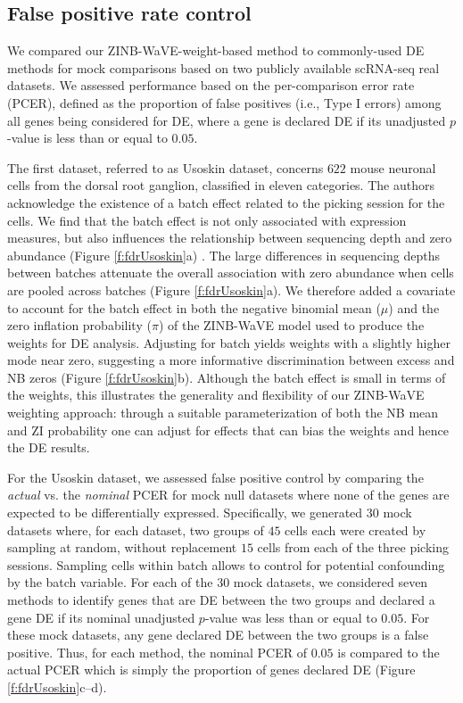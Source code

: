 \documentclass{bmcart}
\newcommand{\lc}[1]{\textcolor{ao}{*** LC: #1}}
\begin{document}
\subsection*{False positive rate control}

We compared our ZINB-WaVE-weight-based method to commonly-used DE methods for mock comparisons based on two publicly available scRNA-seq real datasets. We assessed performance based on the per-comparison error rate (PCER), defined as the proportion of false positives (i.e., Type I errors) among all genes being considered for DE, where a gene is declared DE if its unadjusted $p$-value is less than or equal to $0.05$. 

The first dataset, referred to as Usoskin \citep{Usoskin2014} dataset, concerns $622$ mouse neuronal cells from the dorsal root ganglion, classified in eleven categories. The authors acknowledge the existence of a batch effect related to the picking session for the cells. We find that the batch effect is not only associated with expression measures, but also influences the relationship between sequencing depth and zero abundance (Figure \ref{f:fdrUsoskin}a) \citep{Hicks2015}. The large differences in sequencing depths between batches attenuate the overall association with zero abundance when cells are pooled across batches (Figure \ref{f:fdrUsoskin}a). We therefore added a covariate to account for the batch effect in both the negative binomial mean ($\mu$) and the zero inflation probability ($\pi$) of the ZINB-WaVE model used to produce the weights for DE analysis. Adjusting for batch yields weights with a slightly higher mode near zero, suggesting a more informative discrimination between excess and NB zeros (Figure \ref{f:fdrUsoskin}b). %
Although the batch effect is small in terms of the weights, this illustrates the generality and flexibility of our ZINB-WaVE weighting approach: through a suitable parameterization of both the NB mean and ZI probability one can adjust for effects that can bias the weights and hence the DE results. 

For the Usoskin dataset, we assessed false positive control by comparing the \textit{actual} vs. the \textit{nominal} PCER for mock null datasets where none of the genes are expected to be differentially expressed. Specifically, we generated $30$ mock datasets where, for each dataset, two groups of $45$ cells each were created by sampling at random, without replacement $15$ cells from each of the three picking sessions. Sampling cells within batch allows to control for potential confounding by the batch variable. For each of the $30$ mock datasets, we considered seven methods to identify genes that are DE between the two groups and declared a gene DE if its nominal unadjusted $p$-value was less than or equal to $0.05$. For these mock datasets, any gene declared DE between the two groups is a false positive. Thus, for each method, the nominal PCER of $0.05$ is compared to the actual PCER which is simply the proportion of genes declared DE (Figure \ref{f:fdrUsoskin}c--d).
\end{document}
